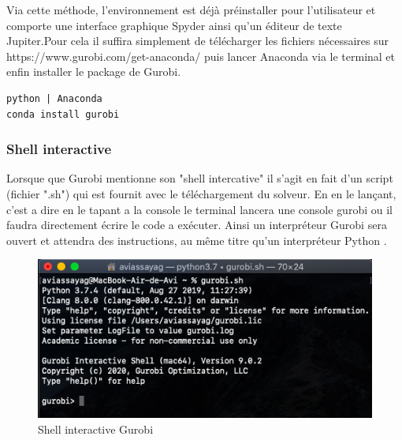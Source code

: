 \documentclass[a4paper, 12pt, twoside]{article}
\begin{document}
Via cette méthode, l'environnement est déjà préinstaller pour l'utilisateur et comporte une interface graphique \textsf{Spyder} ainsi qu'un éditeur de texte \textsf{Jupiter}.Pour cela il suffira simplement de télécharger les fichiers nécessaires sur https://www.gurobi.com/get-anaconda/ puis lancer \textsf{Anaconda} via le terminal et enfin installer le package de \textsf{Gurobi}.
\begin{verbatim}
python | Anaconda
conda install gurobi 
\end{verbatim}


\subsubsection{Shell interactive }
Lorsque que \textsf{Gurobi} mentionne son "shell intercative" il s'agit en fait d'un script (fichier ".sh") qui est fournit avec le téléchargement du solveur. En en le lançant, c'est a dire en le tapant a la console le terminal lancera une console \textsf{gurobi} ou il faudra directement écrire le code a exécuter. Ainsi un interpréteur \textsf{Gurobi} sera ouvert et attendra des instructions, au même titre qu'un interpréteur \textsf{Python} .
\begin{center}
\begin{figure}[h!]
\centering
\includegraphics[scale=0.8]{console.png}
\caption{Shell interactive Gurobi }
\end{figure}
\end{center}
\end{document}
